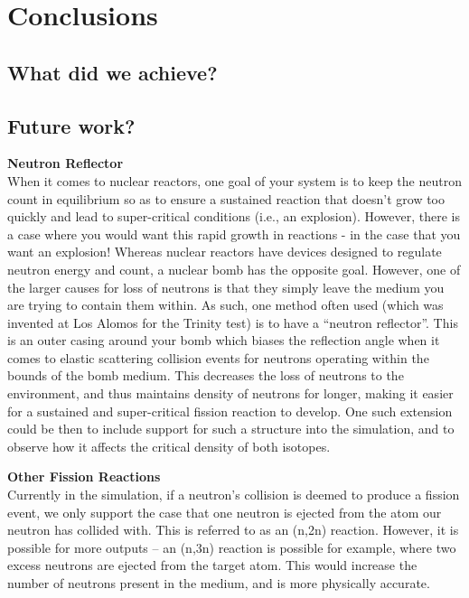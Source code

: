 \section{Conclusions}

\subsection{What did we achieve?}

\subsection{Future work?}


\textbf{Neutron Reflector} \\
When it comes to nuclear reactors, one goal of your system is to keep the neutron count in equilibrium so as to ensure a sustained 
reaction that doesn't grow too quickly and lead to super-critical conditions (i.e., an explosion). However, there is a case 
where you would want this rapid growth in reactions - in the case that you want an explosion! Whereas nuclear reactors have 
devices designed to regulate neutron energy and count, a nuclear bomb has the opposite goal. However, one of the larger 
causes for loss of neutrons is that they simply leave the medium you are trying to contain them within. As such, one 
method often used (which was invented at Los Alomos for the Trinity test) is to have a ``neutron reflector''. This is an 
outer casing around your bomb which biases the reflection angle when it comes to elastic scattering collision events for neutrons 
operating within the bounds of the bomb medium. This decreases the loss of neutrons to the environment, and thus maintains 
density of neutrons for longer, making it easier for a sustained and super-critical fission reaction to develop. One such extension 
could be then to include support for such a structure into the simulation, and to observe how it affects the critical density of both 
isotopes. 

\noindent\textbf{Other Fission Reactions} \\
Currently in the simulation, if a neutron's collision is deemed to produce a fission event, we only support the case that one neutron 
is ejected from the atom our neutron has collided with. This is referred to as an (n,2n) reaction. However, it is possible 
for more outputs -- an (n,3n) reaction is possible for example, where two excess neutrons are ejected from the target atom. This would 
increase the number of neutrons present in the medium, and is more physically accurate. 

